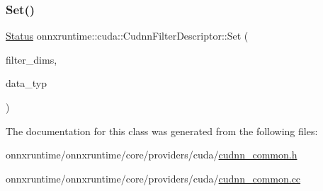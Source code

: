 \mbox{\label{classonnxruntime_1_1cuda_1_1CudnnFilterDescriptor_a65807223db58a737e7d1fe609fbbb38c}} 
\subsubsection{\texorpdfstring{Set()}{Set()}}
{\footnotesize\ttfamily \mbox{\hyperlink{classonnxruntime_1_1common_1_1Status}{Status}} onnxruntime\+::cuda\+::\+Cudnn\+Filter\+Descriptor\+::\+Set (\begin{DoxyParamCaption}\item[{const std\+::vector$<$ int64\+\_\+t $>$ \&}]{filter\+\_\+dims,  }\item[{cudnn\+Data\+Type\+\_\+t}]{data\+\_\+typ }\end{DoxyParamCaption})}



The documentation for this class was generated from the following files\+:\begin{DoxyCompactItemize}
\item 
onnxruntime/onnxruntime/core/providers/cuda/\mbox{\hyperlink{cudnn__common_8h}{cudnn\+\_\+common.\+h}}\item 
onnxruntime/onnxruntime/core/providers/cuda/\mbox{\hyperlink{cudnn__common_8cc}{cudnn\+\_\+common.\+cc}}\end{DoxyCompactItemize}
